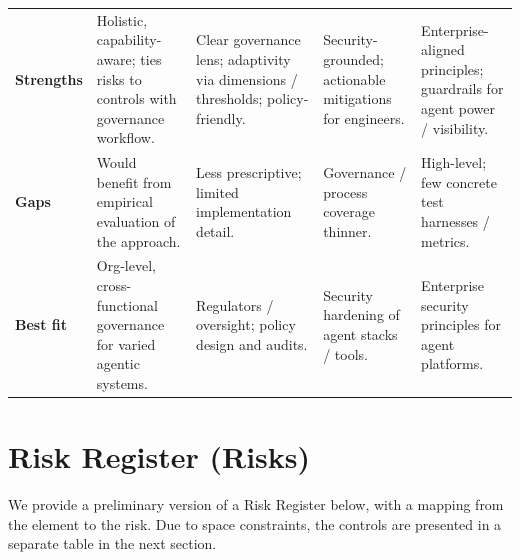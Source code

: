 \documentclass{article}
\begin{document}
{\begin{longtable}{P{0.18\textwidth} P{0.19\textwidth} P{0.19\textwidth} P{0.19\textwidth} P{0.19\textwidth}}
\textbf{Strengths} &
Holistic, capability-aware; ties risks to controls with governance workflow. &
Clear governance lens; adaptivity via dimensions / thresholds; policy-friendly. &
Security-grounded; actionable mitigations for engineers. &
Enterprise-aligned principles; guardrails for agent power / visibility. \\

\textbf{Gaps} &
Would benefit from empirical evaluation of the approach. &
Less prescriptive; limited implementation detail. &
Governance / process coverage thinner. &
High-level; few concrete test harnesses / metrics. \\

\textbf{Best fit} &
Org-level, cross-functional governance for varied agentic systems. &
Regulators / oversight; policy design and audits. &
Security hardening of agent stacks / tools. &
Enterprise security principles for agent platforms. \\

\end{longtable}
}

\section{Risk Register (Risks)}
\label{app:risk-register-risks}

We provide a preliminary version of a Risk Register below, with a mapping from the element to the risk. Due to space constraints, the controls are presented in a separate table in the next section.
\end{document}
